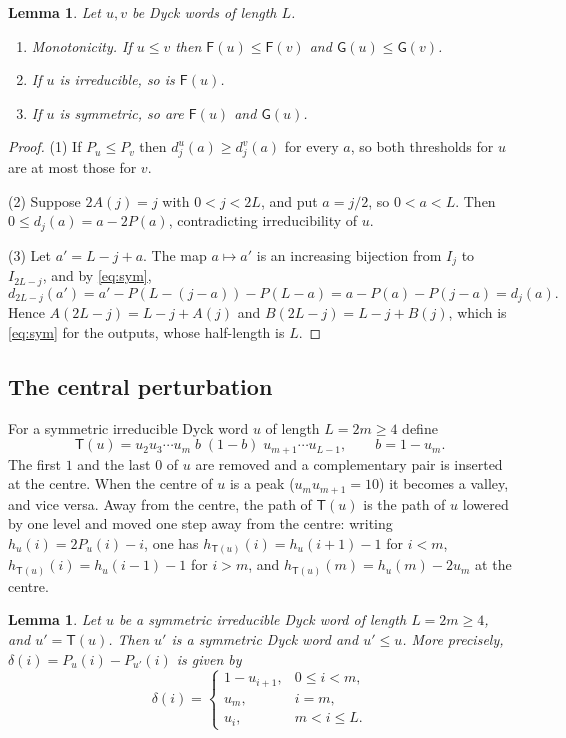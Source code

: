 \documentclass[11pt]{amsart}
\newtheorem{lemma}[proposition]{Lemma}
\theoremstyle{definition}
\theoremstyle{remark}
\numberwithin{equation}{section}
\newcommand{\cF}{\mathsf F}
\newcommand{\cG}{\mathsf G}
\newcommand{\cT}{\mathsf T}
\begin{document}
\begin{lemma}\label{lem:props}
Let $u,v$ be Dyck words of length $L$.
\begin{enumerate}
\item \emph{Monotonicity.} If $u\le v$ then $\cF(u)\le\cF(v)$ and $\cG(u)\le\cG(v)$.
\item If $u$ is irreducible, so is $\cF(u)$.
\item If $u$ is symmetric, so are $\cF(u)$ and $\cG(u)$.
\end{enumerate}
\end{lemma}

\begin{proof}
(1) If $P_u\le P_v$ then $d^u_j(a)\ge d^v_j(a)$ for every $a$, so both thresholds for $u$ are at most those for $v$.

(2) Suppose $2A(j)=j$ with $0<j<2L$, and put $a=j/2$, so $0<a<L$. Then $0\le d_j(a)=a-2P(a)$, contradicting irreducibility of $u$.

(3) Let $a'=L-j+a$. The map $a\mapsto a'$ is an increasing bijection from $I_j$ to $I_{2L-j}$, and by \eqref{eq:sym},
\[
d_{2L-j}(a')=a'-P(L-(j-a))-P(L-a)=a-P(a)-P(j-a)=d_j(a).
\]
Hence $A(2L-j)=L-j+A(j)$ and $B(2L-j)=L-j+B(j)$, which is \eqref{eq:sym} for the outputs, whose half-length is $L$.
\end{proof}

\subsection{The central perturbation} For a symmetric irreducible Dyck word $u$ of length $L=2m\ge4$ define
\[
\cT(u)=u_2u_3\cdots u_m\;b\;(1-b)\;u_{m+1}\cdots u_{L-1},\qquad b=1-u_m.
\]
The first $1$ and the last $0$ of $u$ are removed and a complementary pair is inserted at the centre. When the centre of $u$ is a peak ($u_mu_{m+1}=10$) it becomes a valley, and vice versa. Away from the centre, the path of $\cT(u)$ is the path of $u$ lowered by one level and moved one step away from the centre: writing $h_u(i)=2P_u(i)-i$, one has $h_{\cT(u)}(i)=h_u(i+1)-1$ for $i<m$, $h_{\cT(u)}(i)=h_u(i-1)-1$ for $i>m$, and $h_{\cT(u)}(m)=h_u(m)-2u_m$ at the centre.

\begin{lemma}\label{lem:T}
Let $u$ be a symmetric irreducible Dyck word of length $L=2m\ge4$, and $u'=\cT(u)$. Then $u'$ is a symmetric Dyck word and $u'\le u$. More precisely, $\delta(i)=P_u(i)-P_{u'}(i)$ is given by
\begin{equation}\label{eq:delta}
\delta(i)=\begin{cases}1-u_{i+1},&0\le i<m,\\ u_m,&i=m,\\ u_i,&m<i\le L.\end{cases}
\end{equation}
\end{lemma}
\end{document}
